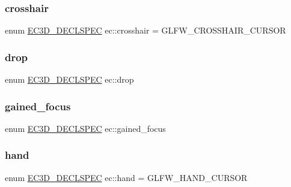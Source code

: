 \subsubsection{\texorpdfstring{crosshair}{crosshair}}
{\footnotesize\ttfamily enum \mbox{\hyperlink{_common_8h_aac42573e202ca3dd4d259c81691e2369}{E\+C3\+D\+\_\+\+D\+E\+C\+L\+S\+P\+EC}} ec\+::crosshair = G\+L\+F\+W\+\_\+\+C\+R\+O\+S\+S\+H\+A\+I\+R\+\_\+\+C\+U\+R\+S\+OR\hspace{0.3cm}{\ttfamily [strong]}}

\mbox{\label{namespaceec_ac1c8382601881db68a89d49d959b3fb8}} 
\subsubsection{\texorpdfstring{drop}{drop}}
{\footnotesize\ttfamily enum \mbox{\hyperlink{_common_8h_aac42573e202ca3dd4d259c81691e2369}{E\+C3\+D\+\_\+\+D\+E\+C\+L\+S\+P\+EC}} ec\+::drop\hspace{0.3cm}{\ttfamily [strong]}}

\mbox{\label{namespaceec_a1e2dd185f2ea6b2729b32fec30917a0e}} 
\subsubsection{\texorpdfstring{gained\+\_\+focus}{gained\_focus}}
{\footnotesize\ttfamily enum \mbox{\hyperlink{_common_8h_aac42573e202ca3dd4d259c81691e2369}{E\+C3\+D\+\_\+\+D\+E\+C\+L\+S\+P\+EC}} ec\+::gained\+\_\+focus\hspace{0.3cm}{\ttfamily [strong]}}

\mbox{\label{namespaceec_ac46e526319ef43480ea56e96f7042e10}} 
\subsubsection{\texorpdfstring{hand}{hand}}
{\footnotesize\ttfamily enum \mbox{\hyperlink{_common_8h_aac42573e202ca3dd4d259c81691e2369}{E\+C3\+D\+\_\+\+D\+E\+C\+L\+S\+P\+EC}} ec\+::hand = G\+L\+F\+W\+\_\+\+H\+A\+N\+D\+\_\+\+C\+U\+R\+S\+OR\hspace{0.3cm}{\ttfamily [strong]}}

